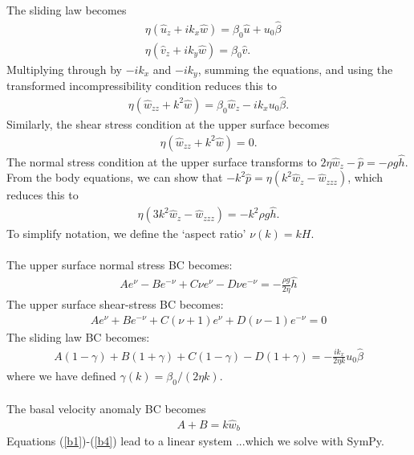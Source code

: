 \documentclass[paper=a4, fontsize=11pt]{article}
\begin{document}
The sliding law becomes
\begin{align}
&\eta( \widehat{u}_z + ik_x \widehat{w}) = \beta_0\widehat{u} + u_0\widehat{\beta} \\
&\eta( \widehat{v}_z + ik_y \widehat{w}) = \beta_0\widehat{v}.
\end{align}
Multiplying through by $-ik_x$ and $-ik_y$, summing the equations, and using the transformed incompressibility
condition reduces this to
\begin{align}
\eta(\widehat{w}_{zz} + k^2 \widehat{w}) = \beta_0 \widehat{w}_z - ik_x   u_0\widehat{\beta}.
\end{align}
Similarly, the shear stress condition at the upper surface becomes
\begin{align}
\eta(\widehat{w}_{zz} + k^2 \widehat{w}) =  0.
\end{align}
The normal stress condition at the upper surface transforms to
$
2\eta \widehat{w}_{z} - \widehat{p} = -\rho g \widehat{h}.
$
From the body equations, we can show that
$-k^2 \widehat{p} = \eta(k^2\widehat{w}_z - \widehat{w}_{zzz}) $, which reduces this to
\begin{align}
\eta (3k^2 \widehat{w}_{z}-\widehat{w}_{zzz})  = -k^2 \rho g \widehat{h}.
\end{align}
To simplify notation, we define the `aspect ratio' $\nu(k) = kH$.\\ \\
The upper surface normal stress BC becomes:
\begin{align}
{A} e^{\nu} - {B} e^{-\nu} + {C}\nu e^{\nu} - {D}\nu e^{-\nu}
=- \frac{\rho g }{2\eta }\widehat{h} \label{b1}
\end{align}
The upper surface shear-stress BC becomes:
\begin{align}
A e^{\nu} + B e^{-\nu} + C(\nu+1) e^{\nu} +D(\nu-1) e^{-\nu} =  0
\end{align}
The sliding law BC becomes:
\begin{align}
{A(1-\gamma)} + {B(1+\gamma)} + {C(1-\gamma)}  - {D(1+\gamma)} = -\frac{ ik_x }{2\eta k}u_0\widehat{\beta}
\end{align}
where we have defined $\gamma(k) = \beta_0/(2\eta k)$. \\
\\ The basal velocity anomaly BC becomes
\begin{align}
{A} + {B}  = k\widehat{w}_b \label{b4}
\end{align}
Equations (\ref{b1})-(\ref{b4}) lead to a linear system
...which we solve with SymPy.\\ \\
\end{document}
